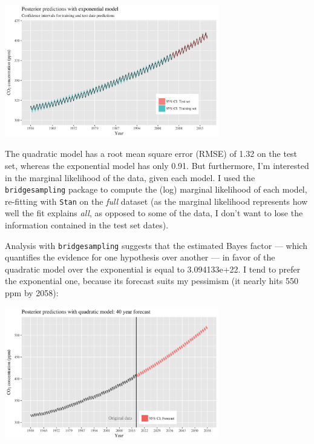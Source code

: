 \documentclass[]{article}
\let\origfigure=\figure
\let\endorigfigure=\endfigure
\renewenvironment{figure}[1][]{%
  \origfigure[H]
}{%
  \endorigfigure
}
\begin{document}
\begin{figure}
\centering
\includegraphics[width=0.7\textwidth]{mauna_loa/exp_intervals.png}
\caption{Exponential model posterior sampling}
\end{figure}

The quadratic model has a root mean square error (RMSE) of 1.32 on the
test set, whereas the exponential model has only 0.91. But furthermore,
I'm interested in the marginal likelihood of the data, given each model.
I used the \texttt{bridgesampling} package to compute the (log) marginal
likelihood of each model, re-fitting with \texttt{Stan} on the
\emph{full} dataset (as the marginal likelihood represents how well the
fit explains \emph{all}, as opposed to some of the data, I don't want to
lose the information contained in the test set dates). \newline

Analysis with \texttt{bridgesampling} suggests that the estimated Bayes
factor --- which quantifies the evidence for one hypothesis over another
--- in favor of the quadratic model over the exponential is equal to
3.094133e+22. I tend to prefer the exponential one, because its forecast
suits my pessimism (it nearly hits 550 ppm by 2058):\newline

\begin{figure}
\centering
\includegraphics[width=0.7\textwidth]{mauna_loa/quad_forecast.png}
\caption{Quadratic forecast}
\end{figure}
\end{document}
